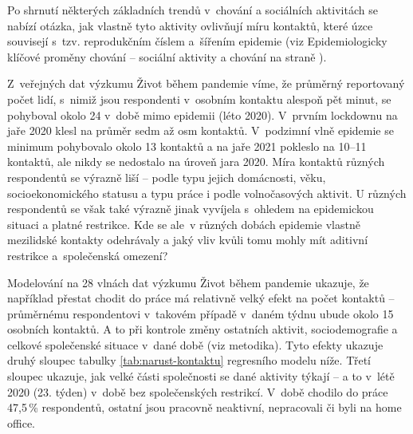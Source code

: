 Po shrnutí některých základních trendů v chování a sociálních aktivitách se nabízí otázka, jak vlastně tyto aktivity ovlivňují míru kontaktů, které úzce souvisejí s tzv. reprodukčním číslem a šířením epidemie (viz Epidemiologicky klíčové proměny chování – sociální aktivity a chování na straně \pageref{Epidemi_promeny}). 

Z veřejných dat výzkumu Život během pandemie víme, že průměrný reportovaný počet lidí, s nimiž jsou respondenti v osobním kontaktu alespoň pět minut, se pohyboval okolo 24 v době mimo epidemii (léto 2020). V prvním lockdownu na jaře 2020 klesl na průměr sedm až osm kontaktů. V podzimní vlně epidemie se minimum pohybovalo okolo 13 kontaktů a na jaře 2021 pokleslo na 10--11 kontaktů, ale nikdy se nedostalo na úroveň jara 2020. Míra kontaktů různých respondentů se výrazně liší – podle typu jejich domácnosti, věku, socioekonomického statusu a typu práce i podle volnočasových aktivit. U různých respondentů se však také výrazně jinak vyvíjela s ohledem na epidemickou situaci a platné restrikce. Kde se ale v různých dobách epidemie vlastně mezilidské kontakty odehrávaly a jaký vliv kvůli tomu mohly mít aditivní restrikce a společenská omezení? 

Modelování na 28 vlnách dat výzkumu Život během pandemie ukazuje, že například přestat chodit do práce má relativně velký efekt na počet kontaktů – průměrnému respondentovi v takovém případě v daném týdnu ubude okolo 15 osobních kontaktů. A to při kontrole změny ostatních aktivit, sociodemografie a celkové společenské situace v dané době (viz metodika). Tyto efekty ukazuje druhý sloupec tabulky \ref{tab:narust-kontaktu} regresního modelu níže. Třetí sloupec ukazuje, jak velké části společnosti se dané aktivity týkají – a to v létě 2020 (23. týden)
v době bez společenských restrikcí. V době chodilo do práce 47,5\,\% respondentů, ostatní jsou pracovně neaktivní, nepracovali či byli na home office. 


